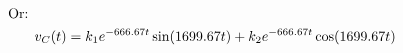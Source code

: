 \documentclass[preview]{standalone}
\begin{document}
\begin{center}
\begin{align*}
                                \text{Or: } \\ \hfill & v_C(t) = k_1e^{-666.67t}\sin(1699.67t) + k_2e^{-666.67t}\cos(1699.67t)
                                \end{align*}
\end{center}
\end{document}

